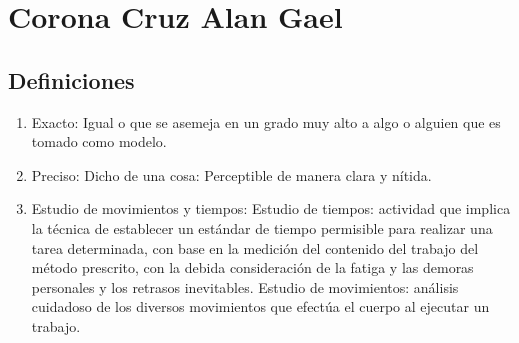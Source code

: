 \section{Corona Cruz Alan Gael}
\subsection{Definiciones}

\begin{enumerate}
    \item Exacto: Igual o que se asemeja en un grado muy alto a algo o alguien que es tomado como modelo. 
    \item Preciso: Dicho de una cosa: Perceptible de manera clara y nítida.
    \item Estudio de movimientos y tiempos: Estudio de tiempos: actividad que implica la técnica de establecer un estándar de tiempo permisible para realizar una tarea determinada, con base en la medición del contenido del trabajo del método prescrito, con la debida consideración de la fatiga y las demoras personales y los retrasos inevitables.
Estudio de movimientos: análisis cuidadoso de los diversos movimientos que efectúa el cuerpo al ejecutar un trabajo.
\end{enumerate}